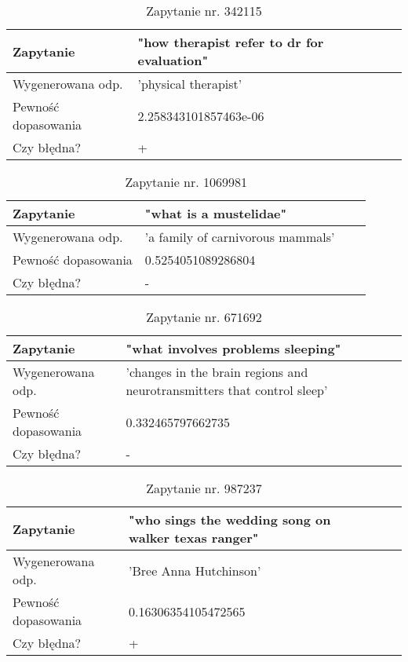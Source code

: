 \begin{table}[htp!]
\centering
\caption{Zapytanie nr. 342115}
\vspace*{5mm}
\begin{tabular}{llll}
   Zapytanie & "how therapist refer to dr for evaluation"\\
   \hline
    Wygenerowana odp. & 'physical therapist' \\
    \hline
    Pewność dopasowania &  2.258343101857463e-06\\
    \hline
    Czy błędna? & +\\
\end{tabular}
\end{table}

\begin{table}[htp!]
\centering
\caption{Zapytanie nr. 1069981}
\vspace*{5mm}
\begin{tabular}{llll}
   Zapytanie & "what is a mustelidae"\\
   \hline
    Wygenerowana odp. & 'a family of carnivorous mammals' \\
    \hline
    Pewność dopasowania &  0.5254051089286804\\
    \hline
    Czy błędna? & -\\
\end{tabular}
\end{table}

 \begin{table}[htp!]
\centering
\caption{Zapytanie nr. 671692}
\vspace*{5mm}
\begin{tabular}{llll}
   Zapytanie & "what involves problems sleeping"\\
   \hline
    Wygenerowana odp. & 'changes in the brain regions and neurotransmitters that control sleep' \\
    \hline
    Pewność dopasowania &  0.332465797662735\\
    \hline
    Czy błędna? & -\\
\end{tabular}
\end{table}

 \begin{table}[htp!]
\centering
\caption{Zapytanie nr. 987237}
\vspace*{5mm}
\begin{tabular}{llll}
   Zapytanie & "who sings the wedding song on walker texas ranger"\\
   \hline
    Wygenerowana odp. & 'Bree Anna Hutchinson' \\
    \hline
    Pewność dopasowania & 0.16306354105472565\\
    \hline
    Czy błędna? & +\\
\end{tabular}
\end{table}

